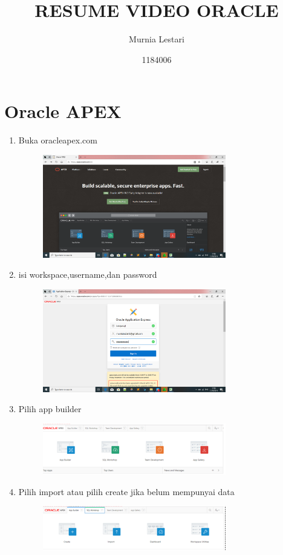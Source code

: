 \documentclass{article}
\title{RESUME VIDEO ORACLE}
\author{Murnia Lestari}
\date{1184006}
\begin{document}
\maketitle

\section{Oracle APEX}
\begin{enumerate}
\item Buka oracleapex.com
\begin{figure}[h]
\centerline{\includegraphics[width=8cm]{figure/sa.png}}
            \end{figure}
            \item isi workspace,username,dan password
\begin{figure}[h]
\centerline{\includegraphics[width=8cm]{figure/su.png}}
            \end{figure}
\newpage\item Pilih app builder
\begin{figure}[h]
\centerline{\includegraphics[width=8cm]{figure/1.png}}
            \end{figure}
            \item Pilih import atau pilih create jika belum mempunyai data
\begin{figure}[h]
\centerline{\includegraphics[width=8cm]{figure/2.png}}

\end{figure}
\end{enumerate}
\end{document}
